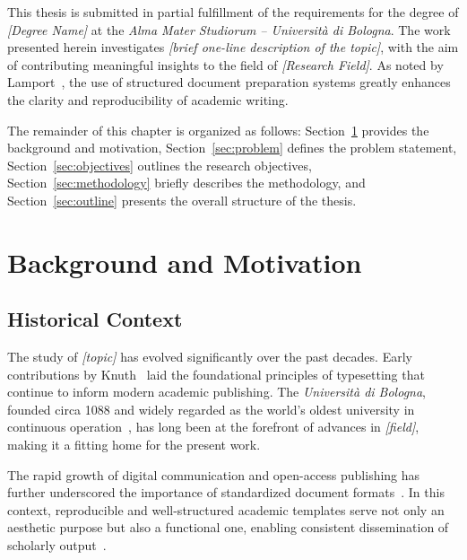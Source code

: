 
This thesis is submitted in partial fulfillment of the requirements for the degree of
\textit{[Degree Name]} at the \textit{Alma Mater Studiorum -- Università di Bologna}.
The work presented herein investigates \textit{[brief one-line description of the topic]},
with the aim of contributing meaningful insights to the field of \textit{[Research Field]}.
As noted by Lamport~\cite{lamport1994latex}, the use of structured document preparation
systems greatly enhances the clarity and reproducibility of academic writing.

The remainder of this chapter is organized as follows: Section~\ref{sec:background}
provides the background and motivation, Section~\ref{sec:problem} defines the problem
statement, Section~\ref{sec:objectives} outlines the research objectives,
Section~\ref{sec:methodology} briefly describes the methodology, and
Section~\ref{sec:outline} presents the overall structure of the thesis.

\section{Background and Motivation}
\label{sec:background}

\subsection{Historical Context}
\label{subsec:historical}

The study of \textit{[topic]} has evolved significantly over the past decades.
Early contributions by Knuth~\cite{knuth1984texbook} laid the foundational
principles of typesetting that continue to inform modern academic publishing.
The \textit{Università di Bologna}, founded circa 1088 and widely regarded as
the world's oldest university in continuous operation~\cite{rashdall1936universities},
has long been at the forefront of advances in \textit{[field]}, making it a
fitting home for the present work.

The rapid growth of digital communication and open-access publishing has further
underscored the importance of standardized document formats~\cite{mittelbach2004latex}.
In this context, reproducible and well-structured academic templates serve not
only an aesthetic purpose but also a functional one, enabling consistent
dissemination of scholarly output~\cite{knuth1984texbook}.

